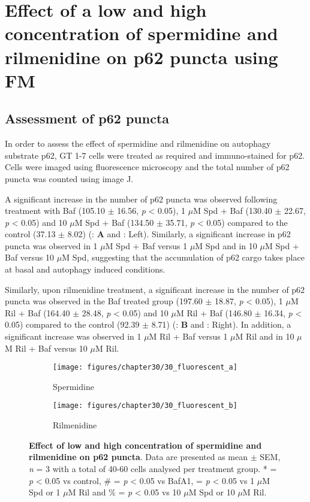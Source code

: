 {\section{Effect of a low and high concentration of spermidine and rilmenidine on p62 puncta using FM}
\subsection{Assessment of p62 puncta}

In order to assess the effect of spermidine and rilmenidine on autophagy substrate p62, GT 1-7 cells were treated as required and immuno-stained for p62. Cells were imaged using fluorescence microscopy and the total number of p62 puncta was counted using image J. 

A significant increase in the number of p62 puncta was observed following treatment with Baf (105.10 $\pm$ 16.56, \textit{p} < 0.05), 1 $\mu$M Spd + Baf (130.40 $\pm$ 22.67, \textit{p} < 0.05) and 10 $\mu$M Spd + Baf (134.50 $\pm$ 35.71, \textit{p} < 0.05) compared to the control (37.13 $\pm$ 8.02) (: \textbf{A} and : Left). Similarly, a significant increase in p62 puncta was observed in 1 $\mu$M Spd + Baf versus 1 $\mu$M Spd and in 10 $\mu$M Spd + Baf versus 10 $\mu$M Spd, suggesting that the accumulation of p62 cargo takes place at basal and autophagy induced conditions. 

Similarly, upon rilmenidine treatment, a significant increase in the number of p62 puncta was observed in the Baf treated group (197.60 $\pm$ 18.87, \textit{p} < 0.05), 1 $\mu$M Ril + Baf (164.40 $\pm$ 28.48, \textit{p} < 0.05) and 10 $\mu$M Ril + Baf (146.80 $\pm$ 16.34, \textit{p} < 0.05) compared to the control (92.39 $\pm$ 8.71) (: \textbf{B} and : Right). In addition, a significant increase was observed in 1 $\mu$M Ril + Baf versus 1 $\mu$M Ril and in 10 $\mu$M Ril + Baf versus 10 $\mu$M Ril.

\begin{figure}[!htbp]
  \begin{subfigure}[b]{0.495\linewidth}
    \texttt{[image: figures/chapter30/30\_fluorescent\_a]}
    \caption{Spermidine}
  \end{subfigure}
  \begin{subfigure}[b]{0.495\linewidth}
    \texttt{[image: figures/chapter30/30\_fluorescent\_b]}
    \caption{Rilmenidine}
  \end{subfigure}
    \caption[Effect of a low and high concentration of spermidine and rilmenidine on p62 puncta]{\textbf{Effect of low and high concentration of spermidine and rilmenidine on p62 puncta}. Data are presented as mean $\pm$ SEM, \textit{n} = 3 with a total of 40-60 cells analysed per treatment group. * = \textit{p} < 0.05 vs control, \# = \textit{p} < 0.05 vs BafA1, \@ = \textit{p} < 0.05 vs 1 $\mu$M Spd or 1 $\mu$M Ril and \% = \textit{p} < 0.05 vs 10 $\mu$M Spd or 10 $\mu$M Ril.}
  \label{fig:30_fluorescent_graph}
\end{figure}

}
